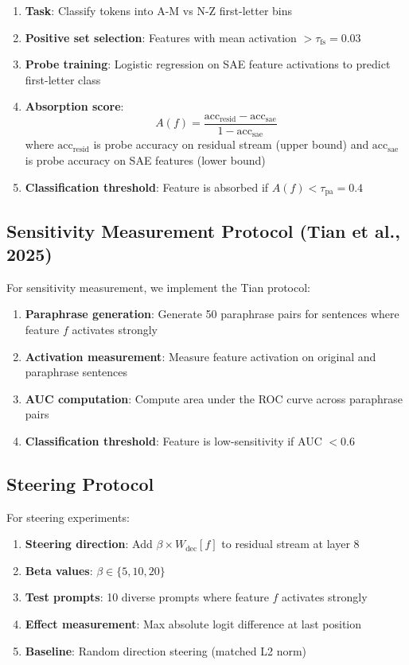\documentclass{article}
\begin{document}
\begin{enumerate}
  \item \textbf{Task}: Classify tokens into A-M vs N-Z first-letter bins
  \item \textbf{Positive set selection}: Features with mean activation $>\tau_{\text{fs}} = 0.03$
  \item \textbf{Probe training}: Logistic regression on SAE feature activations to predict first-letter class
  \item \textbf{Absorption score}:
    \begin{equation}
    A(f) = \frac{\text{acc}_{\text{resid}} - \text{acc}_{\text{sae}}}{1 - \text{acc}_{\text{sae}}}
    \end{equation}
    where $\text{acc}_{\text{resid}}$ is probe accuracy on residual stream (upper bound) and $\text{acc}_{\text{sae}}$ is probe accuracy on SAE features (lower bound)
  \item \textbf{Classification threshold}: Feature is absorbed if $A(f) < \tau_{\text{pa}} = 0.4$
\end{enumerate}

\subsection{Sensitivity Measurement Protocol (Tian et al., 2025)}

For sensitivity measurement, we implement the Tian protocol:

\begin{enumerate}
  \item \textbf{Paraphrase generation}: Generate 50 paraphrase pairs for sentences where feature $f$ activates strongly
  \item \textbf{Activation measurement}: Measure feature activation on original and paraphrase sentences
  \item \textbf{AUC computation}: Compute area under the ROC curve across paraphrase pairs
  \item \textbf{Classification threshold}: Feature is low-sensitivity if AUC $< 0.6$
\end{enumerate}

\subsection{Steering Protocol}

For steering experiments:

\begin{enumerate}
  \item \textbf{Steering direction}: Add $\beta \times W_{\text{dec}}[f]$ to residual stream at layer 8
  \item \textbf{Beta values}: $\beta \in \{5, 10, 20\}$
  \item \textbf{Test prompts}: 10 diverse prompts where feature $f$ activates strongly
  \item \textbf{Effect measurement}: Max absolute logit difference at last position
  \item \textbf{Baseline}: Random direction steering (matched L2 norm)
\end{enumerate}
\end{document}
